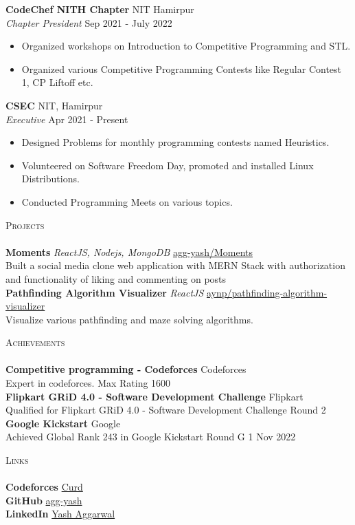 \documentclass[a4paper]{article}
\newcommand{\lineunder} {
    \vspace*{-8pt} \\
    \hspace*{-18pt} \hrulefill \\
}
\newcommand{\header} [1] {
    {\hspace*{-18pt}\vspace*{6pt} \textsc{#1}}
    \vspace*{-6pt} \lineunder
}
\begin{document}
\textbf{CodeChef NITH Chapter} \hfill NIT Hamirpur\\
\textit{Chapter President} \hfill Sep 2021 - July 2022\\
\vspace{-1mm}
\begin{itemize} \itemsep 1pt
	\item Organized workshops on Introduction to Competitive Programming and STL.
	\item Organized various Competitive Programming Contests like Regular Contest 1, CP Liftoff etc.
\end{itemize}
\textbf{CSEC} \hfill NIT, Hamirpur\\
\textit{Executive} \hfill Apr 2021 - Present\\
\vspace{-1mm}
\begin{itemize} \itemsep 1pt
	\item Designed Problems for monthly programming contests named Heuristics.
	\item Volunteered on Software Freedom Day, promoted and installed Linux Distributions.
	\item Conducted Programming Meets on various topics.
\end{itemize}

\header{Projects}
{\textbf{Moments}} {\sl ReactJS, Nodejs, MongoDB} \hfill \href{https://github.com/agg-yash/Moments}{agg-yash/Moments}\\
Built a social media clone web application with MERN Stack with authorization and functionality of liking and commenting on posts\\
\vspace*{2mm}
{\textbf{Pathfinding Algorithm Visualizer}} {\sl ReactJS} \hfill \href{https://github.com/aynp/pathfinding-algorithm-visualizer}{aynp/pathfinding-algorithm-visualizer}\\
Visualize various pathfinding and maze solving algorithms.\\
\vspace*{2mm}

\header{Achievements}
\textbf{Competitive programming - Codeforces} \hfill Codeforces\\
Expert in codeforces. \hfill Max Rating 1600\\
\vspace*{2mm}
\textbf{Flipkart GRiD 4.0 - Software Development Challenge} \hfill Flipkart\\
Qualified for Flipkart GRiD 4.0 - Software Development Challenge Round 2 \hfill \\
\vspace*{2mm}
\textbf{Google Kickstart} \hfill Google\\
Achieved Global Rank 243 in Google Kickstart Round G \hfill 1 Nov 2022\\
\vspace*{2mm}


\header{Links}
{\textbf{Codeforces}} \hfill \href{https://codeforces.com/profile/Curd}{Curd}\\
\vspace*{2mm}
{\textbf{GitHub}} \hfill \href{https://github.com/agg-yash}{agg-yash}\\
\vspace*{2mm}
{\textbf{LinkedIn}} \hfill \href{https://www.linkedin.com/in/agg-yash/}{Yash Aggarwal}\\
\
\end{document}
